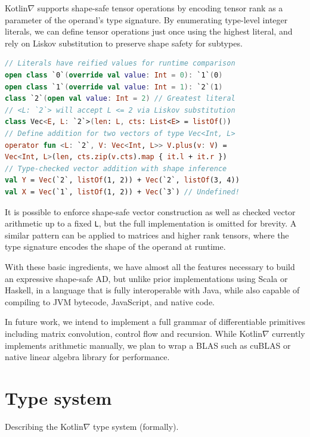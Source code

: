 \documentclass[12pt,initial,twoside,maitrise]{dms}
\numberwithin{equation}{section}
\numberwithin{table}{chapter}
\numberwithin{figure}{chapter}
\begin{document}
Kotlin$\nabla$ supports shape-safe tensor operations by encoding tensor rank as a parameter of the operand's type signature. By enumerating type-level integer literals, we can define tensor operations just once using the highest literal, and rely on Liskov substitution to preserve shape safety for subtypes.

\begin{lstlisting}[caption={Shape safe tensor addition for rank-1 tensors, $\forall L\leq2.$}, language=Kotlin]
// Literals have reified values for runtime comparison
open class `0`(override val value: Int = 0): `1`(0)
open class `1`(override val value: Int = 1): `2`(1)
class `2`(open val value: Int = 2) // Greatest literal
// <L: `2`> will accept L <= 2 via Liskov substitution
class Vec<E, L: `2`>(len: L, cts: List<E> = listOf())
// Define addition for two vectors of type Vec<Int, L>
operator fun <L: `2`, V: Vec<Int, L>> V.plus(v: V) =
Vec<Int, L>(len, cts.zip(v.cts).map { it.l + it.r })
// Type-checked vector addition with shape inference
val Y = Vec(`2`, listOf(1, 2)) + Vec(`2`, listOf(3, 4))
val X = Vec(`1`, listOf(1, 2)) + Vec(`3`) // Undefined!
\end{lstlisting}

It is possible to enforce shape-safe vector construction as well as checked vector arithmetic up to a fixed \texttt{L}, but the full implementation is omitted for brevity. A similar pattern can be applied to matrices and higher rank tensors, where the type signature encodes the shape of the operand at runtime.

With these basic ingredients, we have almost all the features necessary to build an expressive shape-safe AD, but unlike prior implementations using Scala or Haskell, in a language that is fully interoperable with Java, while also capable of compiling to JVM bytecode, JavaScript, and native code.

In future work, we intend to implement a full grammar of differentiable primitives including matrix convolution, control flow and recursion. While Kotlin$\nabla$ currently implements arithmetic manually, we plan to wrap a BLAS such as cuBLAS or native linear algebra library for performance.

\section{Type system}\label{sec:type-system}

Describing the Kotlin$\nabla$ type system (formally).
\end{document}
